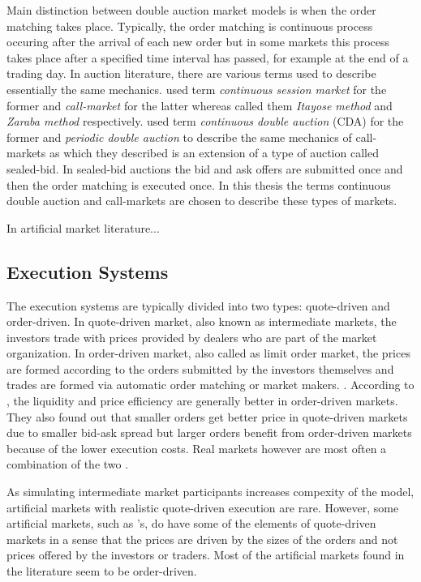 Main distinction between double auction market models is when
the order matching takes place. Typically, the order matching 
is continuous process occuring after the arrival of each new order but
in some markets this process takes place after a specified time interval
has passed, for example at the end of a trading day. \citep{boer05}
In auction literature, there are various terms used to describe essentially 
the same mechanics. \citet{boer05} used term 
\textit{continuous session market} for the former and \textit{call-market}
for the latter whereas \citet{ASt05} called them \textit{Itayose method}
and \textit{Zaraba method} respectively. \citet{Moc15} used term \textit{continuous 
double auction} (CDA) for the former and \textit{periodic double auction} to describe 
the same mechanics of call-markets as which they described is an extension of 
a type of auction called sealed-bid. In sealed-bid auctions the bid and ask offers
are submitted once and then the order matching is executed once. In this thesis
the terms continuous double auction and call-markets are chosen to describe
these types of markets.

In artificial market literature...
 
\subsection{Execution Systems}
The execution systems are typically divided into two types:
quote-driven and order-driven. In quote-driven market, also known
as intermediate markets, the investors trade with prices provided 
by dealers who are part of the market organization. 
In order-driven market, also called as limit order market, 
the prices are formed according to the orders submitted by the 
investors themselves and trades are formed via automatic order matching 
or market makers. \citep{Baru17}. According to \citet{MALINOVA2013104},
the liquidity and price efficiency are generally better in order-driven 
markets. They also found out that smaller orders get better price in 
quote-driven markets due to smaller bid-ask spread 
but larger orders benefit from order-driven markets because of the lower 
execution costs. Real markets however are most often a combination
of the two \citep{boer05}.

As simulating intermediate market participants increases compexity
of the model, artificial markets with realistic quote-driven execution are rare. 
However, some artificial markets, such as \citet{SantaFe99}'s, do have some of 
the elements of quote-driven markets in a sense that the prices are driven by 
the sizes of the orders and not prices offered by the investors or traders. 
Most of the artificial markets found in the literature seem to be order-driven.


